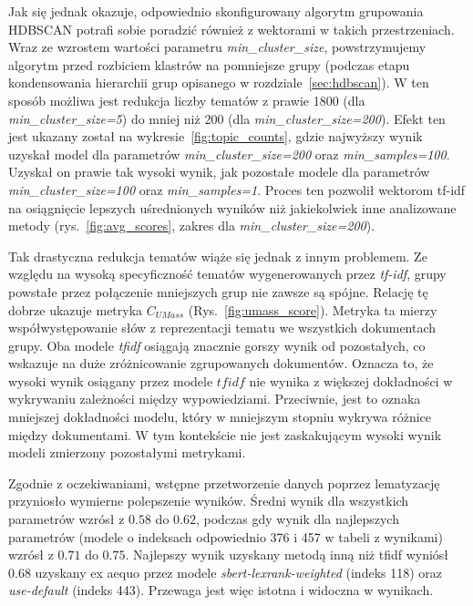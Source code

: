 		Jak się jednak okazuje, odpowiednio skonfigurowany algorytm grupowania HDBSCAN potrafi sobie poradzić również z wektorami w takich przestrzeniach.
		Wraz ze wzrostem wartości parametru \emph{min\_cluster\_size}, powstrzymujemy algorytm przed rozbiciem klastrów na pomniejsze grupy
			(podczas etapu kondensowania hierarchii grup opisanego w rozdziale~\ref{sec:hdbscan}).
		W ten sposób możliwa jest redukcja liczby tematów z prawie 1800 (dla \emph{min\_cluster\_size=5}) do mniej niż 200 (dla \emph{min\_cluster\_size=200}).
		Efekt ten jest ukazany został na wykresie~\ref{fig:topic_counts}, gdzie najwyższy wynik uzyskał model dla parametrów \emph{min\_cluster\_size=200} oraz \emph{min\_samples=100}.
		Uzyskał on prawie tak wysoki wynik, jak pozostałe modele dla parametrów \emph{min\_cluster\_size=100} oraz \emph{min\_samples=1}.
		Proces ten pozwolił wektorom tf-idf na osiągnięcie lepszych uśrednionych wyników niż jakiekolwiek inne analizowane metody (rys.~\ref{fig:avg_scores}, zakres dla \emph{min\_cluster\_size=200}).

		Tak drastyczna redukcja tematów wiąże się jednak z innym problemem.
		Ze względu na wysoką specyficzność tematów wygenerowanych przez \emph{tf-idf}, grupy powstałe przez połączenie mniejszych grup nie zawsze są spójne.
		Relację tę dobrze ukazuje metryka \(C_{UMass}\) (Rys.~\ref{fig:umass_score}).
		Metryka ta mierzy współwystępowanie słów z reprezentacji tematu we wszystkich dokumentach grupy.
		Oba modele \emph{tfidf} osiągają znacznie gorszy wynik od pozostałych, co wskazuje na duże zróżnicowanie zgrupowanych dokumentów.
		Oznacza to, że wysoki wynik osiągany przez modele \(tfidf\) nie wynika z większej dokładności w wykrywaniu zależności między wypowiedziami.
		Przeciwnie, jest to oznaka mniejszej dokładności modelu, który w mniejszym stopniu wykrywa różnice między dokumentami.
		W tym kontekście nie jest zaskakującym wysoki wynik modeli zmierzony pozostałymi metrykami.

		Zgodnie z oczekiwaniami, wstępne przetworzenie danych poprzez lematyzację przyniosło wymierne polepszenie wyników.
		Średni wynik dla wszystkich parametrów wzrósł z \(0.58\) do \(0.62\),
			podczas gdy wynik dla najlepszych parametrów (modele o indeksach odpowiednio 376 i 457 w tabeli z wynikami) wzrósł z \(0.71\) do \(0.75\).
		Najlepszy wynik uzyskany metodą inną niż tfidf wyniósł \(0.68\) uzyskany ex aequo przez modele \emph{sbert-lexrank-weighted} (indeks 118) oraz \emph{use-default} (indeks 443).
		Przewaga jest więc istotna i widoczna w wynikach.
		
